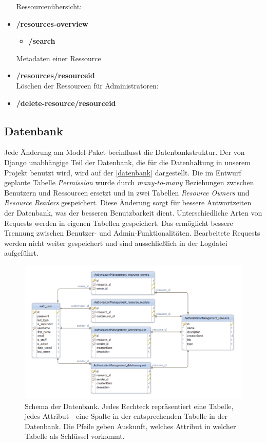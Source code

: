 \documentclass[parskip=full,11pt]{scrartcl}
\begin{document}
\begin{itemize}[itemsep=0pt]
\noindent Ressourcenübersicht:
\item \textbf{/resources-overview}
	\begin{itemize}
	\item \textbf{/search}\\
	\end{itemize}
	
\noindent Metadaten einer Ressource
\item \textbf{/resources/resourceid}\\

\noindent Löschen der Ressourcen für Administratoren:
\item \textbf{/delete-resource/resourceid}
\end{itemize}
 
\newpage 
\subsection{Datenbank}
Jede Änderung am Model-Paket beeinflusst die Datenbankstruktur. Der von Django unabhängige Teil der Datenbank, die für die Datenhaltung in unserem Projekt benutzt wird, wird auf der \autoref{datenbank} dargestellt. Die im Entwurf geplante Tabelle \textit{Permission} wurde durch \textit{many-to-many} Beziehungen zwischen Benutzern und Ressourcen ersetzt und in zwei Tabellen \textit{Resource Owners} und \textit{Resource Readers} gespeichert. Diese Änderung sorgt für bessere Antwortzeiten der Datenbank, was der besseren Benutzbarkeit dient.
Unterschiedliche Arten von Requests werden in eigenen Tabellen gespeichert. Das ermöglicht bessere Trennung zwischen Benutzer- und Admin-Funktionalitäten. Bearbeitete Requests werden nicht weiter gespeichert und sind ausschließlich in der Logdatei aufgeführt.    
 \begin{figure}[ht!]
 	\centering
 	\includegraphics[width=1\textwidth]{res/database.png}
 	\caption{Schema der Datenbank. Jedes Rechteck repräsentiert eine Tabelle,
jedes Attribut - eine Spalte in der entsprechenden Tabelle in der Datenbank. Die
Pfeile geben Auskunft, welches Attribut in welcher Tabelle als Schlüssel vorkommt.}
\label{datenbank}
 \end{figure}
\end{document}
